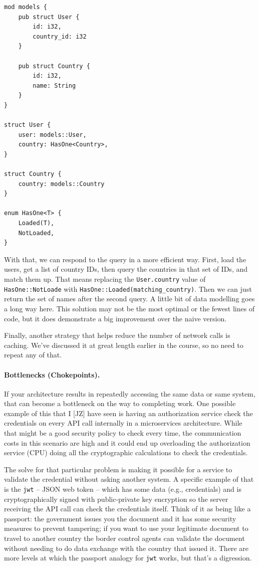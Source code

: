 \begin{lstlisting}
mod models {
    pub struct User {
        id: i32,
        country_id: i32
    }

    pub struct Country {
        id: i32,
        name: String
    }
}

struct User {
    user: models::User,
    country: HasOne<Country>,
}

struct Country {
    country: models::Country
}

enum HasOne<T> {
    Loaded(T),
    NotLoaded,
}
\end{lstlisting}

With that, we can respond to the query in a more efficient way. First, load the users, get a list of country IDs, then query the countries in that set of IDs, and match them up. That means replacing the \texttt{User.country} value of \texttt{HasOne::NotLoade} with \texttt{HasOne::Loaded(matching\_country)}. Then we can just return the set of names after the second query. A little bit of data modelling goes a long way here. This solution may not be the most optimal or the fewest lines of code, but it does demonstrate a big improvement over the naive version.


Finally, another strategy that helps reduce the number of network calls is caching. We've discussed it at great length earlier in the course, so no need to repeat any of that.

\paragraph{Bottlenecks (Chokepoints).} 

If your architecture results in repeatedly accessing the same data or same system, that can become a bottleneck on the way to completing work. One possible example of this that I [JZ] have seen is having an authorization service check the credentials on every API call internally in a microservices architecture. While that might be a good security policy to check every time, the communication costs in this scenario are high and it could end up overloading the authorization service (CPU) doing all the cryptographic calculations to check the credentials.

The solve for that particular problem is making it possible for a service to validate the credential without asking another system. A specific example of that is the \texttt{jwt} -- JSON web token -- which has some data (e.g., credentials) and is cryptographically signed with public-private key encryption so the server receiving the API call can check the credentials itself. Think of it as being like a passport: the government issues you the document and it has some security measures to prevent tampering; if you want to use your legitimate document to travel to another country the border control agents can validate the document without needing to do data exchange with the country that issued it. There are more levels at which the passport analogy for \texttt{jwt} works, but that's a digression.


